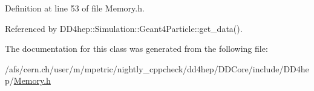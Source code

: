 Definition at line 53 of file Memory.h.

Referenced by DD4hep::Simulation::Geant4Particle::get\_\-data().

The documentation for this class was generated from the following file:\begin{DoxyCompactItemize}
\item 
/afs/cern.ch/user/m/mpetric/nightly\_\-cppcheck/dd4hep/DDCore/include/DD4hep/\hyperlink{_memory_8h}{Memory.h}\end{DoxyCompactItemize}
